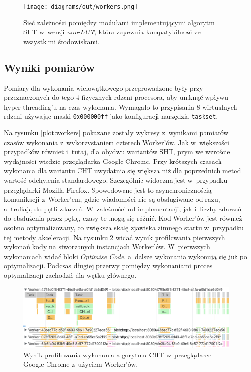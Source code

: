 \begin{figure}[h]
    \centering
    \texttt{[image: diagrams/out/workers.png]}
    \caption{Sieć zależności pomiędzy modułami implementującymi algorytm SHT w~wersji \textit{non-LUT}, która zapewnia kompatybilność ze wszystkimi środowiskami.}
    \label{fig:workers-struct}
\end{figure}

\subsection{Wyniki pomiarów}

Pomiary dla wykonania wielowątkowego przeprowadzone były przy przeznaczonych do tego 4 fizycznych rdzeni procesora, aby uniknąć wpływu hyper-threading'u na czas wykonania. Wymagało to przypisania 8 wirtualnych rdzeni używając maski \lstinline{0x000000ff} jako konfiguracji narzędzia \lstinline{taskset}.




Na rysunku \ref{plot:workers} pokazane zostały wykresy z~wynikami pomiarów czasów wykonania z~wykorzystaniem czterech Worker'ów. Jak w~większości przypadków również i~tutaj, dla obydwu wariantów SHT, prym we wzroście wydajności wiedzie przeglądarka Google Chrome. Przy krótszych czasach wykonania dla wariantu CHT uwydatnia się większa niż dla poprzednich metod wartość odchylenia standardowego. Szczególnie widoczna jest w~przypadku przeglądarki Mozilla Firefox. Spowodowane jest to asynchronicznością komunikacji z~Worker'em, gdzie wiadomości nie są obsługiwane od razu, a~trafiają do pętli zdarzeń. W~zależności od implementacji, jak i~liczby zdarzeń do obsłużenia przez pętlę, czasy te mogą się różnić. Kod Worker'ów jest również osobno optymalizowany, co zwiększa skalę zjawiska zimnego startu w~przypadku tej metody akceleracji.  Na rysunku \ref{fig:profiler-workers} widać wynik profilowania pierwszych wykonań kody na stworzonych instancjach Worker'ów. W~pierwszych wykonaniach widać bloki \textit{Optimise Code}, a~dalsze wykonania wykonują się już po optymalizacji. Podczas długiej przerwy pomiędzy wykonaniami proces optymalizacji zachodził dla wątku głównego.

\begin{figure}[h]
    \centering
    \includegraphics[width=\linewidth]{img/workers-profiler.png}
    \caption{Wynik profilowania wykonania algorytmu CHT w~przeglądarce Google Chrome z~użyciem Worker'ów.}
    \label{fig:profiler-workers}
\end{figure}

